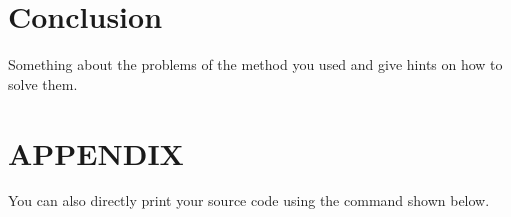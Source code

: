 \documentclass[10pt, a4paper, twocolumn]{article} %
\begin{document}
\section{Conclusion}
Something about the problems of the method you used and give hints on how to solve them.

\section*{APPENDIX}

You can also directly print your source code using the command shown below.






\printbibliography[title={Bibliography}] %

\end{document}
